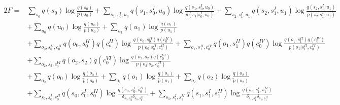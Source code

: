 \documentclass[fleqn]{article}
\begin{document}
\begin{alignat*}{2}
    F = & \sum_{s_0} q(s_0) \log \frac{q(s_0)}{p(s_0)} + \sum_{s_1, s^{\scriptscriptstyle I}_0, u_0} q(s_1, s^{\scriptscriptstyle I}_0, u_0) \log \frac{q(s_1, s^{\scriptscriptstyle I}_0, u_0)}{p(s_1| s^{\scriptscriptstyle I}_0, u_0)} + \sum_{s_2, s^{\scriptscriptstyle I}_1, u_1} q(s_2, s^{\scriptscriptstyle I}_1, u_1) \log \frac{q(s_2, s^{\scriptscriptstyle I}_1, u_1)}{p(s_2| s^{\scriptscriptstyle I}_1, u_1)} \\
        & + \sum_{u_0} q(u_0) \log \frac{q(u_0)}{p(u_0)} + \sum_{u_1} q(u_1) \log \frac{q(u_1)}{p(u_1)}                                                                                                                              \\
        & + \sum_{o_0, s^{\scriptscriptstyle II}_0, c^{\scriptscriptstyle II}_0} q(o_0, s^{\scriptscriptstyle II}_0)q(c^{\scriptscriptstyle II}_o) \log \frac{q(o_0, s^{\scriptscriptstyle II}_0)q(c^{\scriptscriptstyle II}_0)}{p(o_0| s^{\scriptscriptstyle II}_0, c^{\scriptscriptstyle II}_0)} + \sum_{o_1, s^{\scriptscriptstyle II}_1, c^{\scriptscriptstyle IV}_0} q(o_1, s^{\scriptscriptstyle II}_1)q(c^{\scriptscriptstyle IV}_0) \log \frac{q(o_1, s^{\scriptscriptstyle II}_1)q(c^{\scriptscriptstyle IV}_0)}{p(o_1| s^{\scriptscriptstyle II}_1, c^{\scriptscriptstyle IV}_0)}                                          \\
        & + \sum_{o_2, s_2, c^{\scriptscriptstyle VI}_0} q(o_2, s_2) q(c^{\scriptscriptstyle VI}_0) \log \frac{q(o_2, s_2)q(c^{\scriptscriptstyle VI}_0)}{p(o_2| s_2, c^{\scriptscriptstyle VI}_0)}                                                                                                                                    \\
        & + \sum_{o_0} q(o_0) \log \frac{q(o_0)}{\tilde{p}(o_0)} + \sum_{o_1} q(o_1) \log \frac{q(o_1)}{\tilde{p}(o_1)} + \sum_{o_2} q(o_2) \log \frac{q(o_2)}{\tilde{p}(o_2)}                                                       \\
        & + \sum_{s_0, s^{\scriptscriptstyle I}_0, s^{\scriptscriptstyle II}_0} q(s_0, s^{\scriptscriptstyle I}_0, s^{\scriptscriptstyle II}_0) \log \frac{q(s_0, s^{\scriptscriptstyle I}_0, s^{\scriptscriptstyle II}_0)}{\delta_{s_0, s^{\scriptscriptstyle I}_0} \delta_{s_0, s^{\scriptscriptstyle II}_0}} + \sum_{s_1, s^{\scriptscriptstyle I}_1, s^{\scriptscriptstyle II}_1} q(s_1, s^{\scriptscriptstyle I}_1, s^{\scriptscriptstyle II}_1) \log \frac{q(s_1, s^{\scriptscriptstyle I}_1, s^{\scriptscriptstyle II}_1)}{\delta_{s_1, s^{\scriptscriptstyle I}_1} \delta_{s_1, s^{\scriptscriptstyle II}_1}} \\

\end{alignat*}
\end{document}
